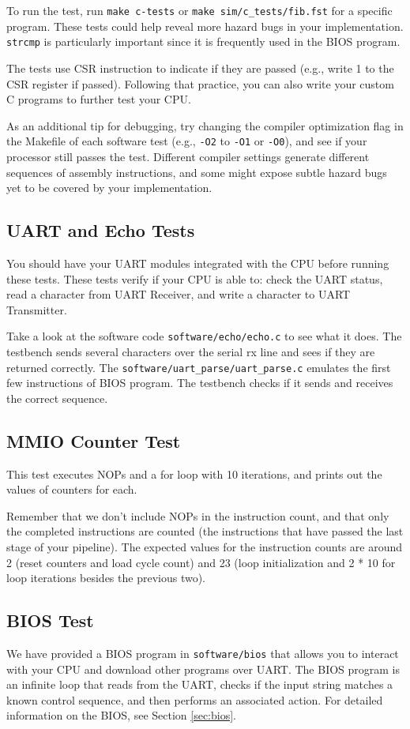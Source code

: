 To run the test, run \verb|make c-tests| or \verb|make sim/c_tests/fib.fst| for a specific program.
These tests could help reveal more hazard bugs in your implementation.
\verb|strcmp| is particularly important since it is frequently used in the BIOS program.

The tests use CSR instruction to indicate if they are passed
(e.g., write 1 to the CSR register if passed).
Following that practice, you can also write your custom C programs to further test your CPU.

As an additional tip for debugging, try changing the compiler optimization flag in the Makefile
of each software test (e.g., \verb|-O2| to \verb|-O1| or \verb|-O0|),
and see if your processor still passes the test.
Different compiler settings generate different sequences of assembly instructions,
and some might expose subtle hazard bugs yet to be covered by your implementation.

\subsection{UART and Echo Tests}
You should have your UART modules integrated with the CPU before running these tests.
These tests verify if your CPU is able to: check the UART status,
read a character from UART Receiver, and write a character to UART Transmitter.

Take a look at the software code \verb|software/echo/echo.c| to see what it does.
The testbench sends several characters over the serial rx line and sees if they are returned correctly.
The \verb|software/uart_parse/uart_parse.c| emulates the first few instructions of BIOS program.
The testbench checks if it sends and receives the correct sequence.

\subsection{MMIO Counter Test}
This test executes NOPs and a for loop with 10 iterations,
and prints out the values of counters for each.

Remember that we don't include NOPs in the instruction count,
and that only the completed instructions are counted
(the instructions that have passed the last stage of your pipeline).
The expected values for the instruction counts are around
2 (reset counters and load cycle count)
and 23 (loop initialization and 2 * 10 for loop iterations besides the previous two).

\subsection{BIOS Test}
We have provided a BIOS program in \verb|software/bios| that allows you to interact
with your CPU and download other programs over UART.
The BIOS program is an infinite loop that reads from the UART,
checks if the input string matches a known control sequence,
and then performs an associated action.
For detailed information on the BIOS, see Section \ref{sec:bios}.

